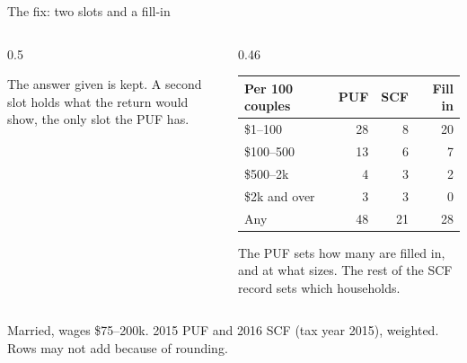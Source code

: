 \documentclass[11pt,aspectratio=169]{beamer}
\newcommand{\slidenote}[1]{\par\vfill{\scriptsize\color{yalegrey}#1}}
\begin{document}
\begin{frame}{The fix: two slots and a fill-in}
  \begin{columns}[c]
    \begin{column}{0.5\textwidth}
      \centering

      \vspace{0.8em}
      \small
      The answer given is kept. A second slot holds what the return would show,
      the only slot the PUF has.
    \end{column}
    \begin{column}{0.46\textwidth}
      \centering
      \small
      \begin{tabular}{lrrr}
        \toprule
        Per 100 couples & PUF & SCF & Fill in \\
        \midrule
        \$1--100      & 28 & 8 & 20 \\
        \$100--500    & 13 & 6 & 7 \\
        \$500--2k     & 4  & 3 & 2 \\
        \$2k and over & 3  & 3 & 0 \\
        \midrule
        Any           & 48 & 21 & 28 \\
        \bottomrule
      \end{tabular}

      \vspace{0.8em}
      The PUF sets how many are filled in, and at what sizes.
      The rest of the SCF record sets which households.
    \end{column}
  \end{columns}
  \slidenote{Married, wages \$75--200k. 2015 PUF and 2016 SCF (tax year 2015), weighted. Rows may not add because of rounding.}
\end{frame}
\end{document}

